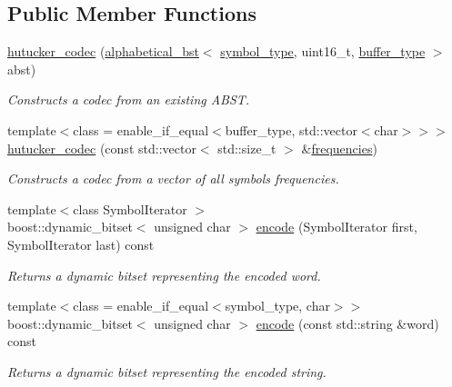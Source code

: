 \subsection*{Public Member Functions}
\begin{DoxyCompactItemize}
\item 
\mbox{\hyperlink{classirk_1_1hutucker__codec_a07f7f1c0f6fa0162dcafe5848fdfbb73}{hutucker\+\_\+codec}} (\mbox{\hyperlink{classirk_1_1alphabetical__bst}{alphabetical\+\_\+bst}}$<$ \mbox{\hyperlink{classirk_1_1hutucker__codec_af23dee5959ae2a69eea0ab324cf6ecb6}{symbol\+\_\+type}}, uint16\+\_\+t, \mbox{\hyperlink{classirk_1_1hutucker__codec_a995378c8c253dae9867a4b1762eeaf95}{buffer\+\_\+type}} $>$ abst)
\begin{DoxyCompactList}\small\item\em Constructs a codec from an existing A\+B\+ST. \end{DoxyCompactList}\item 
{\footnotesize template$<$class  = enable\+\_\+if\+\_\+equal$<$buffer\+\_\+type, std\+::vector$<$char$>$$>$$>$ }\\\mbox{\hyperlink{classirk_1_1hutucker__codec_a41e575e3badde26ab126e10f15ce8315}{hutucker\+\_\+codec}} (const std\+::vector$<$ std\+::size\+\_\+t $>$ \&\mbox{\hyperlink{irk-uncompress_8cpp_a2cd80733ced3d7eda8a6de0389cccc73}{frequencies}})
\begin{DoxyCompactList}\small\item\em Constructs a codec from a vector of all symbols\textquotesingle{} frequencies. \end{DoxyCompactList}\item 
{\footnotesize template$<$class Symbol\+Iterator $>$ }\\boost\+::dynamic\+\_\+bitset$<$ unsigned char $>$ \mbox{\hyperlink{classirk_1_1hutucker__codec_a86c90c76d29d5badfd89b74efe7f1afd}{encode}} (Symbol\+Iterator first, Symbol\+Iterator last) const
\begin{DoxyCompactList}\small\item\em Returns a dynamic bitset representing the encoded word. \end{DoxyCompactList}\item 
{\footnotesize template$<$class  = enable\+\_\+if\+\_\+equal$<$symbol\+\_\+type, char$>$$>$ }\\boost\+::dynamic\+\_\+bitset$<$ unsigned char $>$ \mbox{\hyperlink{classirk_1_1hutucker__codec_a9f69f70ca8a04d326b6828e523500777}{encode}} (const std\+::string \&word) const
\begin{DoxyCompactList}\small\item\em Returns a dynamic bitset representing the encoded string. \end{DoxyCompactList}\item 

\end{DoxyCompactItemize}

